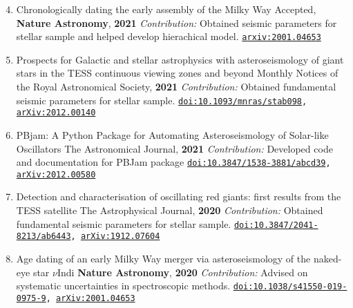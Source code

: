 \documentclass[letterpaper]{k-cv} %
\begin{document}
\textbf{\color{c1}{contributing author publications:}}
\vspace{-0.2cm}
\begin{enumerate}
	\setcounter{enumi}{3}
	\item {}
	{Chronologically dating the early assembly of the Milky Way}
	{Accepted, \textbf{\textcolor{c1}{Nature Astronomy}}, \textbf{2021}}
	{\bodyfont \textit{Contribution:} Obtained seismic parameters for stellar sample and helped develop hierachical model.}
	{\texttt{\href{https://arxiv.org/abs/2001.04653}{arxiv:2001.04653}}}
	
	\item {}
	{Prospects for Galactic and stellar astrophysics with asteroseismology of giant stars in the TESS continuous viewing zones and beyond}
	{Monthly Notices of the Royal Astronomical Society, \textbf{2021}}
	{\bodyfont \textit{Contribution:} Obtained fundamental seismic parameters for stellar sample.}
	{\texttt{\href{https://doi.org/10.1093/mnras/stab098}{doi:10.1093/mnras/stab098}, \href{https://arxiv.org/abs/2012.00140}{arXiv:2012.00140}}}	

	\item {}
	{PBjam: A Python Package for Automating Asteroseismology of Solar-like Oscillators}
	{The Astronomical Journal, \textbf{2021}}
	{\bodyfont \textit{Contribution:} Developed code and documentation for PBJam package}
	{\texttt{\href{https://iopscience.iop.org/article/10.3847/1538-3881/abcd39}{doi:10.3847/1538-3881/abcd39}, \href{https://arxiv.org/abs/2012.00580}{arXiv:2012.00580}}}	

	\item {}
	{Detection and characterisation of oscillating red giants: first results from the TESS satellite}
	{The Astrophysical Journal, \textbf{2020}}
	{\bodyfont \textit{Contribution:} Obtained fundamental seismic parameters for stellar sample.}
	{\texttt{\href{https://iopscience.iop.org/article/10.3847/2041-8213/ab6443}{doi:10.3847/2041-8213/ab6443}, \href{https://arxiv.org/abs/1912.07604}{arXiv:1912.07604}}}

	\item {}
	{Age dating of an early Milky Way merger via asteroseismology of the naked-eye star $\nu$Indi}
	{\textbf{\textcolor{c1}{Nature Astronomy}}, \textbf{2020}}
	{\bodyfont \textit{Contribution:} Advised on systematic uncertainties in spectroscopic methods.}
	{\texttt{\href{https://www.nature.com/articles/s41550-019-0975-9}{doi:10.1038/s41550-019-0975-9},  \href{https://arxiv.org/abs/2001.04653}{arXiv:2001.04653}}}
	

\end{enumerate}
\end{document}
